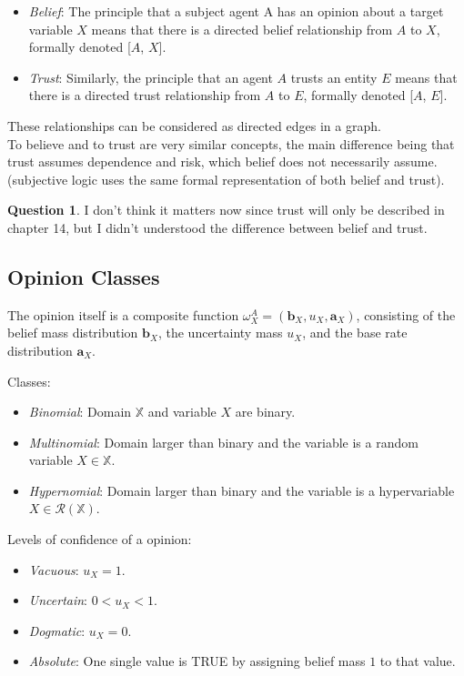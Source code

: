 \documentclass[a4paper,12pt]{article}
\theoremstyle{definition}
\newtheorem{question}{Question}[section]
\numberwithin{equation}{section}
\begin{document}
\begin{itemize}
	\item \emph{Belief}: The principle that a subject agent A has an opinion about a target variable $X$ means that there is a directed belief relationship from $A$ to $X$, formally denoted [$A$, $X$].
	\item \emph{Trust}: Similarly, the principle that an agent $A$ trusts an entity $E$ means that there is a directed trust relationship from $A$ to $E$, formally denoted [$A$, $E$].
\end{itemize}

These relationships can be considered as directed edges in a graph. \\
To believe and to trust are very similar concepts, the main difference being that trust assumes dependence and risk, which belief does not necessarily assume. (subjective logic uses the same formal representation of both belief and trust).

\begin{question}
	I don't think it matters now since trust will only be described in chapter 14, but I didn't understood the difference between belief and trust. 
\end{question}

\subsection{Opinion Classes}

The opinion itself is a composite function $\omega^A_ X = \left(\mathbf{b}_X, u_X, \mathbf{a}_X\right)$, consisting of the belief mass distribution $\mathbf{b}_X$, the uncertainty mass $u_X$, and the base rate distribution $\mathbf{a}_X$.

Classes:
\begin{itemize}
	\item \emph{Binomial}: Domain $\mathbb{X}$ and variable $X$ are binary.
	\item \emph{Multinomial}: Domain larger than binary and the variable is a random variable $X \in \mathbb{X}$.
	\item \emph{Hypernomial}: Domain larger than binary and the variable is a hypervariable $X \in \mathcal{R}(\mathbb{X})$.
\end{itemize}

Levels of confidence of a opinion:
\begin{itemize}
	\item \emph{Vacuous}: $u_X = 1$.
	\item \emph{Uncertain}: $0 < u_X < 1$.
	\item \emph{Dogmatic}: $u_X = 0$.
	\item \emph{Absolute}: One single value is TRUE by assigning belief mass $1$ to that value.
\end{itemize}
\end{document}
